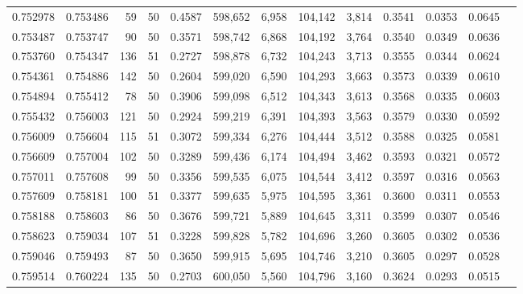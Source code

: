 \begin{tabular}{rrrrrrrrrrrrr}
0.752978 & 0.753486 &    59 &  50 &                                     0.4587 & 598,652 &   6,958 & 104,142 &   3,814 & 0.3541 & 0.0353 & 0.0645 \\
0.753487 & 0.753747 &    90 &  50 &                                     0.3571 & 598,742 &   6,868 & 104,192 &   3,764 & 0.3540 & 0.0349 & 0.0636 \\
0.753760 & 0.754347 &   136 &  51 &                                     0.2727 & 598,878 &   6,732 & 104,243 &   3,713 & 0.3555 & 0.0344 & 0.0624 \\
0.754361 & 0.754886 &   142 &  50 &                                     0.2604 & 599,020 &   6,590 & 104,293 &   3,663 & 0.3573 & 0.0339 & 0.0610 \\
0.754894 & 0.755412 &    78 &  50 &                                     0.3906 & 599,098 &   6,512 & 104,343 &   3,613 & 0.3568 & 0.0335 & 0.0603 \\
0.755432 & 0.756003 &   121 &  50 &                                     0.2924 & 599,219 &   6,391 & 104,393 &   3,563 & 0.3579 & 0.0330 & 0.0592 \\
0.756009 & 0.756604 &   115 &  51 &                                     0.3072 & 599,334 &   6,276 & 104,444 &   3,512 & 0.3588 & 0.0325 & 0.0581 \\
0.756609 & 0.757004 &   102 &  50 &                                     0.3289 & 599,436 &   6,174 & 104,494 &   3,462 & 0.3593 & 0.0321 & 0.0572 \\
0.757011 & 0.757608 &    99 &  50 &                                     0.3356 & 599,535 &   6,075 & 104,544 &   3,412 & 0.3597 & 0.0316 & 0.0563 \\
0.757609 & 0.758181 &   100 &  51 &                                     0.3377 & 599,635 &   5,975 & 104,595 &   3,361 & 0.3600 & 0.0311 & 0.0553 \\
0.758188 & 0.758603 &    86 &  50 &                                     0.3676 & 599,721 &   5,889 & 104,645 &   3,311 & 0.3599 & 0.0307 & 0.0546 \\
0.758623 & 0.759034 &   107 &  51 &                                     0.3228 & 599,828 &   5,782 & 104,696 &   3,260 & 0.3605 & 0.0302 & 0.0536 \\
0.759046 & 0.759493 &    87 &  50 &                                     0.3650 & 599,915 &   5,695 & 104,746 &   3,210 & 0.3605 & 0.0297 & 0.0528 \\
0.759514 & 0.760224 &   135 &  50 &                                     0.2703 & 600,050 &   5,560 & 104,796 &   3,160 & 0.3624 & 0.0293 & 0.0515 \\

\end{tabular}
